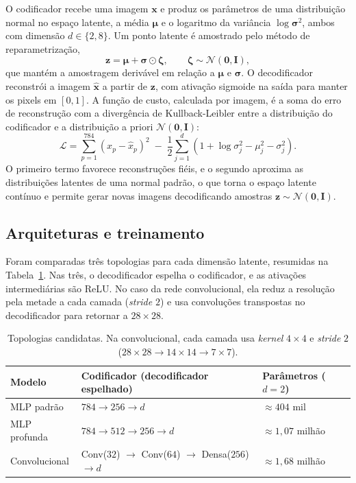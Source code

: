 \documentclass[11pt,a4paper]{article}
\begin{document}
O codificador recebe uma imagem $\mathbf{x}$ e produz os parâmetros de uma
distribuição normal no espaço latente, a média $\boldsymbol{\mu}$ e o logaritmo da
variância $\log \boldsymbol{\sigma}^2$, ambos com dimensão $d \in \{2, 8\}$. Um
ponto latente é amostrado pelo método de reparametrização,
\begin{equation}
  \mathbf{z} = \boldsymbol{\mu} + \boldsymbol{\sigma} \odot \boldsymbol{\zeta},
  \qquad \boldsymbol{\zeta} \sim \mathcal{N}(\mathbf{0}, \mathbf{I}),
\end{equation}
que mantém a amostragem derivável em relação a $\boldsymbol{\mu}$ e
$\boldsymbol{\sigma}$. O decodificador reconstrói a imagem $\hat{\mathbf{x}}$ a
partir de $\mathbf{z}$, com ativação sigmoide na saída para manter os pixels em
$[0,1]$. A função de custo, calculada por imagem, é a soma do erro de reconstrução
com a divergência de Kullback-Leibler entre a distribuição do codificador e a
distribuição a priori $\mathcal{N}(\mathbf{0}, \mathbf{I})$:
\begin{equation}
  \label{eq:loss}
  \mathcal{L} = \sum_{p=1}^{784} \left( x_p - \hat{x}_p \right)^2
  \; - \; \frac{1}{2} \sum_{j=1}^{d}
  \left( 1 + \log \sigma_j^2 - \mu_j^2 - \sigma_j^2 \right).
\end{equation}
O primeiro termo favorece reconstruções fiéis, e o segundo aproxima as
distribuições latentes de uma normal padrão, o que torna o espaço latente
contínuo e permite gerar novas imagens decodificando amostras
$\mathbf{z} \sim \mathcal{N}(\mathbf{0}, \mathbf{I})$.

\subsection{Arquiteturas e treinamento}

Foram comparadas três topologias para cada dimensão latente, resumidas na
Tabela~\ref{tab:arquiteturas}. Nas três, o decodificador espelha o codificador,
e as ativações intermediárias são ReLU. No caso da rede convolucional, ela reduz a resolução
pela metade a cada camada (\textit{stride} $2$) e usa convoluções transpostas no
decodificador para retornar a $28 \times 28$.

\begin{table}[H]
  \centering
  \small
  \begin{tabular}{lll}
    \toprule
    Modelo & Codificador (decodificador espelhado) & Parâmetros ($d=2$) \\
    \midrule
    MLP padrão    & $784 \to 256 \to d$ & $\approx 404$ mil \\
    MLP profunda  & $784 \to 512 \to 256 \to d$ & $\approx 1{,}07$ milhão \\
    Convolucional & Conv($32$) $\to$ Conv($64$) $\to$ Densa($256$) $\to d$ & $\approx 1{,}68$ milhão \\
    \bottomrule
  \end{tabular}
  \caption{Topologias candidatas. Na convolucional, cada camada usa
  \textit{kernel} $4 \times 4$ e \textit{stride} $2$
  ($28 \times 28 \to 14 \times 14 \to 7 \times 7$).}
  \label{tab:arquiteturas}
\end{table}
\end{document}

